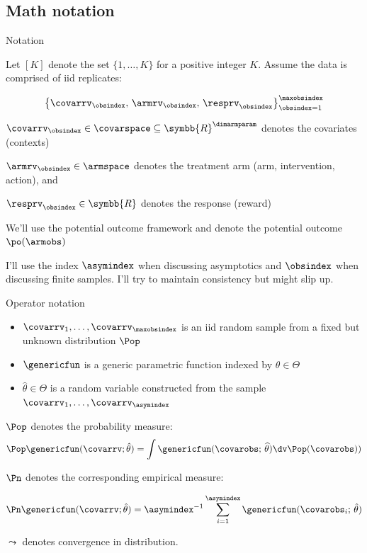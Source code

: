 \documentclass[aspectratio=169, professionalfonts]{beamer}
\begin{document}
\subsection{Math notation}
\begin{frame}[label={sec:org00d2d44}]{Notation}

	Let $[K]$ denote the set $\{1, \ldots, K \}$ for a positive integer $K$. Assume
	the data is comprised of iid replicates:

	\begin{equation*}
		\left\{{\covarrv}_{\obsindex},\, {\armrv}_{\obsindex},\,
		{\resprv}_{\obsindex} \right\}_{\obsindex = 1}^{\maxobsindex}
	\end{equation*}


	$\covarrv_{\obsindex} \in \covarspace \subseteq
		\symbb{R}^{\dimarmparam}$ denotes the covariates (contexts)

	$\armrv_{ \obsindex} \in \armspace$ denotes the treatment arm (arm,
	intervention, action), and

	$\resprv_{ \obsindex} \in \symbb{R}$ denotes the response (reward)

	\vfill \pause

	We'll use the potential outcome framework and denote the potential outcome 	$\po(\armobs)$

	\vfill \pause
	I'll use the index $\asymindex$ when discussing asymptotics and $\obsindex$ when discussing finite samples.	I'll try to maintain consistency but might slip up.
\end{frame}


\begin{frame}{Operator notation}
	\begin{itemize}
		\item $\covarrv_1, \ldots, \covarrv_{\maxobsindex}$ is an iid random sample from a
		      fixed but unknown distribution $\Pop$
		\item $\genericfun$ is a generic parametric function indexed by $\theta \in \Theta$
		\item $\hat{\theta} \in \Theta$ is a random variable constructed from the sample
		      $\covarrv_1, \ldots, \covarrv_{\asymindex}$
	\end{itemize}
	\vfill \pause

	$\Pop$ denotes the probability measure:
	\begin{equation*}
		\Pop \genericfun(\covarrv; \hat{\theta}) = \int \genericfun(\covarobs;\,\widehat{\theta}) \dv
		\Pop(\covarobs))
	\end{equation*}

	\vfill \pause $\Pn$ denotes the corresponding empirical measure:

	\begin{equation*}
		\Pn \genericfun(\covarrv; \hat{\theta}) = \asymindex^{-1}\sum_{i =
			1}^{\asymindex} \genericfun(\covarobs_{i};\,\hat{\theta})
	\end{equation*}
	\vfill \pause

	$\leadsto$ denotes convergence in distribution.

	\vfill
\end{frame}
\end{document}
